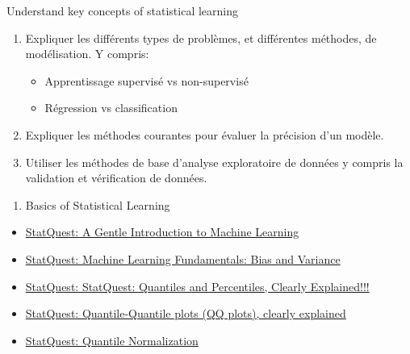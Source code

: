 \documentclass[12pt, titlepage, french]{report}
\begin{document}
\begin{distributions}[Objective]
Understand key concepts of statistical learning
\end{distributions}

\begin{outcomes}
\begin{enumerate}
	\item	Expliquer les différents types de problèmes, et différentes méthodes, de modélisation. Y compris: 
	\begin{itemize}
		\item	Apprentissage supervisé vs non-supervisé
		\item	Régression vs classification	
	\end{itemize}
	\item	Expliquer les méthodes courantes pour évaluer la précision d'un modèle.
	\item	Utiliser les méthodes de base d'analyse exploratoire de données y compris la validation et vérification de données.
\end{enumerate}
\end{outcomes}

\begin{ASM_chapter}
\begin{enumerate}
	\item	Basics of Statistical Learning
\end{enumerate}
\end{ASM_chapter}

\begin{YTB_vids}
\begin{itemize}
	\item	\href{https://www.youtube.com/watch?v=Gv9_4yMHFhI&list=PLblh5JKOoLUICTaGLRoHQDuF_7q2GfuJF&index=2&t=0s}{StatQuest: A Gentle Introduction to Machine Learning}
	\item	\href{https://www.youtube.com/watch?v=EuBBz3bI-aA&list=PLblh5JKOoLUICTaGLRoHQDuF_7q2GfuJF&index=6}{StatQuest: Machine Learning Fundamentals: Bias and Variance}
	\item	\href{https://www.youtube.com/watch?v=IFKQLDmRK0Y&feature=youtu.be}{StatQuest: StatQuest: Quantiles and Percentiles, Clearly Explained!!!}
	\item	\href{https://www.youtube.com/watch?v=okjYjClSjOg&list=PLblh5JKOoLUIcdlgu78MnlATeyx4cEVeR&index=20}{StatQuest: Quantile-Quantile plots (QQ plots), clearly explained}
	\item	\href{https://www.youtube.com/watch?v=ecjN6Xpv6SE&feature=youtu.be}{StatQuest: Quantile Normalization}
\end{itemize}
\end{YTB_vids}
\end{document}
